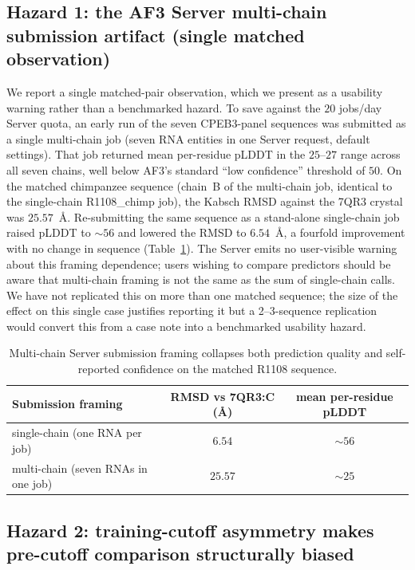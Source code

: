 \documentclass[11pt,a4paper]{article}
\begin{document}
\subsection{Hazard 1: the AF3 Server multi-chain submission artifact
(single matched observation)}
\label{sec:multichain}

We report a single matched-pair observation, which we present as
a usability warning rather than a benchmarked hazard. To save
against the $20$ jobs/day Server quota, an early run of the seven
CPEB3-panel sequences was submitted as a single multi-chain job
(seven RNA entities in one Server request, default settings).
That job returned mean per-residue pLDDT in the $25$--$27$ range
across all seven chains, well below AF3's standard ``low confidence''
threshold of $50$. On the matched chimpanzee sequence (chain~B of the
multi-chain job, identical to the single-chain R1108\_chimp job), the
Kabsch RMSD against the 7QR3 crystal was $25.57$~\AA{}.
Re-submitting the same sequence as a stand-alone single-chain job
raised pLDDT to $\sim$$56$ and lowered the RMSD to $6.54$~\AA{}, a
fourfold improvement with no change in sequence
(Table~\ref{tab:multichain}). The Server emits no user-visible
warning about this framing dependence; users wishing to compare
predictors should be aware that multi-chain framing is not the same
as the sum of single-chain calls. We have not replicated this on
more than one matched sequence; the size of the effect on this
single case justifies reporting it but a 2--3-sequence replication
would convert this from a case note into a benchmarked usability
hazard.

\begin{table}[h!]
\centering
\caption{Multi-chain Server submission framing collapses both
prediction quality and self-reported confidence on the matched R1108
sequence.}
\label{tab:multichain}
\small
\begin{tabular}{lcc}
\toprule
Submission framing & RMSD vs 7QR3:C (\AA{}) & mean per-residue pLDDT \\
\midrule
single-chain (one RNA per job) & $6.54$ & $\sim 56$ \\
multi-chain (seven RNAs in one job) & $25.57$ & $\sim 25$ \\
\bottomrule
\end{tabular}
\end{table}

\subsection{Hazard 2: training-cutoff asymmetry makes pre-cutoff
comparison structurally biased}
\end{document}
